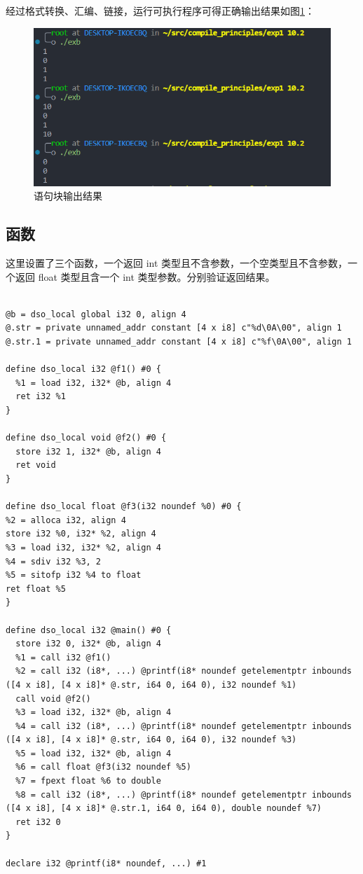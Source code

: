 \documentclass[UTF8,a4paper,10pt]{ctexart}
\begin{document}
经过格式转换、汇编、链接，运行可执行程序可得正确输出结果如图\ref{pic:5}：
\begin{figure}[H]
  \centering
  \includegraphics[width=\textwidth]{figure/exb.png}
  \caption{语句块输出结果}
  \label{pic:5}
\end{figure}

\subsection{函数}
这里设置了三个函数，一个返回 int 类型且不含参数，一个空类型且不含参数，一个返回 float 类型且含一个 int 类型参数。分别验证返回结果。
\begin{verbatim}

@b = dso_local global i32 0, align 4
@.str = private unnamed_addr constant [4 x i8] c"%d\0A\00", align 1
@.str.1 = private unnamed_addr constant [4 x i8] c"%f\0A\00", align 1

define dso_local i32 @f1() #0 {
  %1 = load i32, i32* @b, align 4
  ret i32 %1
}

define dso_local void @f2() #0 {
  store i32 1, i32* @b, align 4
  ret void
}

define dso_local float @f3(i32 noundef %0) #0 {
%2 = alloca i32, align 4
store i32 %0, i32* %2, align 4
%3 = load i32, i32* %2, align 4
%4 = sdiv i32 %3, 2
%5 = sitofp i32 %4 to float
ret float %5
}

define dso_local i32 @main() #0 {
  store i32 0, i32* @b, align 4
  %1 = call i32 @f1()
  %2 = call i32 (i8*, ...) @printf(i8* noundef getelementptr inbounds ([4 x i8], [4 x i8]* @.str, i64 0, i64 0), i32 noundef %1)
  call void @f2()
  %3 = load i32, i32* @b, align 4
  %4 = call i32 (i8*, ...) @printf(i8* noundef getelementptr inbounds ([4 x i8], [4 x i8]* @.str, i64 0, i64 0), i32 noundef %3)
  %5 = load i32, i32* @b, align 4
  %6 = call float @f3(i32 noundef %5)
  %7 = fpext float %6 to double
  %8 = call i32 (i8*, ...) @printf(i8* noundef getelementptr inbounds ([4 x i8], [4 x i8]* @.str.1, i64 0, i64 0), double noundef %7)
  ret i32 0
}

declare i32 @printf(i8* noundef, ...) #1

\end{verbatim}
\end{document}
